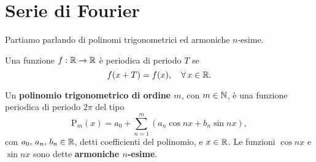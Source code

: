 \documentclass[../../analisi2]{subfiles}
\begin{document}
    \chapter{Serie di Fourier}

        Partiamo parlando di polinomi trigonometrici ed armoniche \(n\)-esime.

        \begin{definizione}
            Una funzione \(f : \mathbb{R} \to \mathbb{R}\) è periodica di periodo \(T\) se
            \[
                f(x + T) = f(x), \quad \forall \, x \in \mathbb{R}.
            \]
        \end{definizione}

        \begin{definizione}
            Un \textbf{polinomio trigonometrico di ordine \(m\)}, con \(m \in \mathbb{N}\), è una funzione periodica di periodo \(2 \pi\) del
            tipo
            \[
                \mathrm{P}_m (x) = a_0 + \sum_{n = 1}^m \left(a_n \cos nx + b_n \sin nx\right),
            \]
            con \(a_0, \, a_n, \, b_n \in \mathbb{R}\), detti coefficienti del polinomio, e \(x \in \mathbb{R}\). Le funzioni \(\cos nx\) e \(\sin nx\)
            sono dette \textbf{armoniche \(n\)-esime}.
        \end{definizione}
\end{document}
